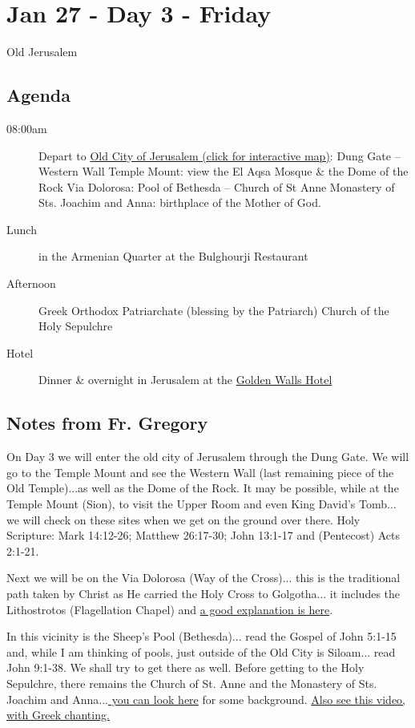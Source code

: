 \documentclass[letterpaper]{report}
\begin{document}
\section{Jan 27 - Day 3 - Friday}
Old Jerusalem
\subsection{Agenda}
\begin{description}
	\item[08:00am] Depart to  \href{http://jerusalem.com/map#!/explore/view}{
			Old City of Jerusalem (click for interactive map)}:
		\subitem Dung Gate – Western Wall
		\subitem Temple Mount:
		    view the El Aqsa Mosque \& the Dome of the Rock 
		\subitem Via Dolorosa:
		    Pool of Bethesda -- Church of St Anne
		\subitem Monastery of Sts. Joachim and Anna:
		    birthplace of the Mother of God.
	\item[Lunch] in the Armenian Quarter at the Bulghourji Restaurant 
	\item[Afternoon] Greek Orthodox Patriarchate (blessing by the Patriarch) 
		\subitem Church of the Holy Sepulchre
	\item[Hotel] Dinner \& overnight in Jerusalem at the
	  \href{http://goldenwalls.com/}{Golden Walls Hotel}
\end{description}

\subsection{Notes from Fr. Gregory}
On Day 3 we will enter the old city of Jerusalem through the Dung Gate.
We will go to the Temple Mount and see the Western Wall
(last remaining piece of the Old Temple)...as well as the Dome of the Rock.
It may be possible, while at the Temple Mount (Sion),
to visit the Upper Room and even King David's Tomb...
we will check on these sites when we get on the ground over there.
Holy Scripture: Mark 14:12-26; Matthew 26:17-30;
John 13:1-17 and (Pentecost) Acts 2:1-21.

Next we will be on the Via Dolorosa (Way of the Cross)...
this is the traditional path taken by Christ as He carried the Holy Cross to
Golgotha...
it includes the Lithostrotos (Flagellation Chapel) and 
\href{http://www.mikemasonbooks.com/the-lithostrotos-chapter-57-of-jesus-his-story-in-stone/}{
	a good explanation is here}.

In this vicinity is the Sheep's Pool (Bethesda)...
read the Gospel of John 5:1-15 and, while I am thinking of pools,
just outside of the Old City is Siloam...
read John 9:1-38. We shall try to get there as well.
Before getting to the Holy Sepulchre,
there remains the Church of St. Anne and the Monastery of Sts. Joachim and
Anna...\href{http://www.seetheholyland.net/church-of-st-anne/}{
	you can look here} for some background.
\href{http://www.johnsanidopoulos.com/2011/09/video-home-of-sts-joachim-and-anna-in.html}{
Also see this video, with Greek chanting.}
\end{document}
